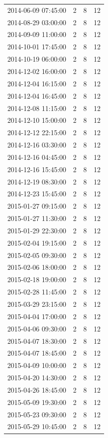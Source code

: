 \begin{tabular}{lrrr}
2014-06-09 07:45:00 & 2 & 8 & 12 \\
2014-08-29 03:00:00 & 2 & 8 & 12 \\
2014-09-09 11:00:00 & 2 & 8 & 12 \\
2014-10-01 17:45:00 & 2 & 8 & 12 \\
2014-10-19 06:00:00 & 2 & 8 & 12 \\
2014-12-02 16:00:00 & 2 & 8 & 12 \\
2014-12-04 16:15:00 & 2 & 8 & 12 \\
2014-12-04 16:45:00 & 2 & 8 & 12 \\
2014-12-08 11:15:00 & 2 & 8 & 12 \\
2014-12-10 15:00:00 & 2 & 8 & 12 \\
2014-12-12 22:15:00 & 2 & 8 & 12 \\
2014-12-16 03:30:00 & 2 & 8 & 12 \\
2014-12-16 04:45:00 & 2 & 8 & 12 \\
2014-12-16 15:45:00 & 2 & 8 & 12 \\
2014-12-19 08:30:00 & 2 & 8 & 12 \\
2014-12-23 15:45:00 & 2 & 8 & 12 \\
2015-01-27 09:15:00 & 2 & 8 & 12 \\
2015-01-27 11:30:00 & 2 & 8 & 12 \\
2015-01-29 22:30:00 & 2 & 8 & 12 \\
2015-02-04 19:15:00 & 2 & 8 & 12 \\
2015-02-05 09:30:00 & 2 & 8 & 12 \\
2015-02-06 18:00:00 & 2 & 8 & 12 \\
2015-02-18 19:00:00 & 2 & 8 & 12 \\
2015-02-28 11:45:00 & 2 & 8 & 12 \\
2015-03-29 23:15:00 & 2 & 8 & 12 \\
2015-04-04 17:00:00 & 2 & 8 & 12 \\
2015-04-06 09:30:00 & 2 & 8 & 12 \\
2015-04-07 18:30:00 & 2 & 8 & 12 \\
2015-04-07 18:45:00 & 2 & 8 & 12 \\
2015-04-09 10:00:00 & 2 & 8 & 12 \\
2015-04-20 14:30:00 & 2 & 8 & 12 \\
2015-04-26 18:45:00 & 2 & 8 & 12 \\
2015-05-09 19:30:00 & 2 & 8 & 12 \\
2015-05-23 09:30:00 & 2 & 8 & 12 \\
2015-05-29 10:45:00 & 2 & 8 & 12 \\

\end{tabular}
